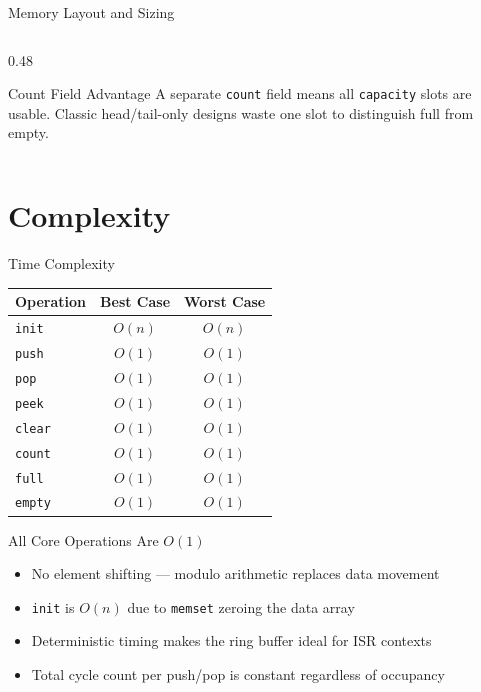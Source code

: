 \documentclass[aspectratio=169, 10pt]{beamer}
\begin{document}
\begin{frame}{Memory Layout and Sizing}
\begin{columns}[T]
\begin{column}{0.48\textwidth}
\vspace{0.3em}
\begin{alertblock}{Count Field Advantage}
A separate \texttt{count} field means all \texttt{capacity}
slots are usable. Classic head/tail-only designs waste one
slot to distinguish full from empty.
\end{alertblock}
\end{column}
\end{columns}
\end{frame}

\section{Complexity}

\begin{frame}{Time Complexity}
\begin{table}
\centering
\begin{tabular}{@{}lcc@{}}
\toprule
\textbf{Operation} & \textbf{Best Case} & \textbf{Worst Case} \\
\midrule
\texttt{init}   & $O(n)$ & $O(n)$ \\
\texttt{push}   & $O(1)$ & $O(1)$ \\
\texttt{pop}    & $O(1)$ & $O(1)$ \\
\texttt{peek}   & $O(1)$ & $O(1)$ \\
\texttt{clear}  & $O(1)$ & $O(1)$ \\
\texttt{count}  & $O(1)$ & $O(1)$ \\
\texttt{full}   & $O(1)$ & $O(1)$ \\
\texttt{empty}  & $O(1)$ & $O(1)$ \\
\bottomrule
\end{tabular}
\end{table}

\vspace{0.5em}
\begin{block}{All Core Operations Are $O(1)$}
\begin{itemize}
  \item No element shifting --- modulo arithmetic replaces data movement
  \item \texttt{init} is $O(n)$ due to \texttt{memset} zeroing the data array
  \item Deterministic timing makes the ring buffer ideal for ISR contexts
  \item Total cycle count per push/pop is constant regardless of occupancy
\end{itemize}
\end{block}
\end{frame}
\end{document}
